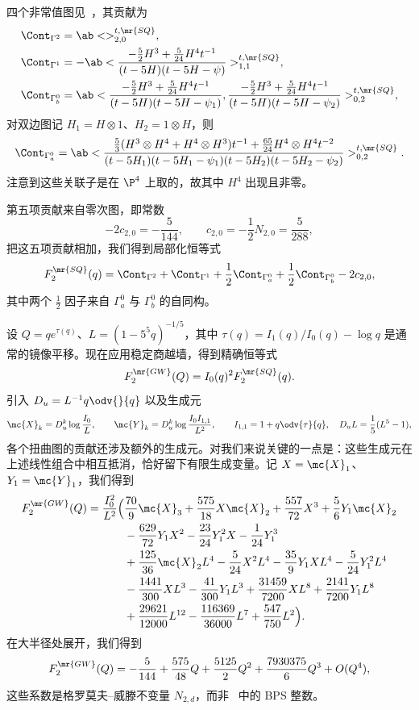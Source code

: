 四个非常值图见~，其贡献为
\begin{align*}
    \Cont_{\Gamma^2} &= \ab<>^{t,\mr{SQ}}_{2,0}, \\
    \Cont_{\Gamma^1} &= -\ab< \frac{-\frac{5}{2}H^3 + \frac{5}{24}H^4t^{-1}}{(t-5H)(t-5H-\psi)}>^{t,\mr{SQ}}_{1,1}, \\
    \Cont_{\Gamma_b^0} &= \ab< \frac{-\frac{5}{2}H^3+\frac{5}{24}H^4t^{-1}}{(t-5H)(t-5H-\psi_1)}, \frac{-\frac{5}{2}H^3+\frac{5}{24}H^4t^{-1}}{(t-5H)(t-5H-\psi_2)}>^{t,\mr{SQ}}_{0,2},
\end{align*}
对双边图记 \(H_1 = H \otimes 1\)、\(H_2 = 1 \otimes H\)，则
\[ \Cont_{\Gamma_a^0} = \ab< \frac{\frac{5}{3}(H^3\otimes H^4 + H^4 \otimes H^3)t^{-1} + \frac{65}{24}H^4 \otimes H^4 t^{-2}}{(t-5H_1)(t-5H_1-\psi_1)(t-5H_2)(t-5H_2-\psi_2)}>^{t,\mr{SQ}}_{0,2}. \]
注意到这些关联子是在 \(\P^4\) 上取的，故其中 \(H^4\) 出现且非零。

第五项贡献来自零次图，即常数
\[ -2c_{2,0} = -\frac{5}{144}, \qquad c_{2,0} = -\frac{1}{2}N_{2,0} = \frac{5}{288}, \]
把这五项贡献相加，我们得到局部化恒等式
\[ F_2^{\mr{SQ}}(q) = \Cont_{\Gamma^2} + \Cont_{\Gamma^1} + \frac{1}{2}\Cont_{\Gamma_a^0} + \frac{1}{2}\Cont_{\Gamma_b^0} - 2c_{2,0}, \]
其中两个 \(\frac{1}{2}\) 因子来自 \(\Gamma_a^0\) 与 \(\Gamma_b^0\) 的自同构。

设 \(Q = qe^{\tau(q)}\)、\(L = (1-5^5q)^{-1/5}\)，其中 \(\tau(q) = I_1(q)/I_0(q) - \log q\) 是通常的镜像平移。现在应用稳定商越墙，得到精确恒等式
\[ F_2^{\mr{GW}}(Q) = I_0(q)^2 F_2^{\mr{SQ}}(q). \]
引入 \(D_u = L^{-1}q\odv{}{q}\) 以及生成元
\[ \mc{X}_k = D_u^k \log \frac{I_0}{L}, \qquad \mc{Y}_k = D_u^k \log \frac{I_0I_{1,1}}{L^2}, \qquad I_{1,1} = 1 + q \odv{\tau}{q}, \quad D_u L = \frac{1}{5}(L^5-1), \]
各个扭曲图的贡献还涉及额外的生成元。对我们来说关键的一点是：这些生成元在上述线性组合中相互抵消，恰好留下有限生成变量。记 \(X = \mc{X}_1\)、\(Y_1 = \mc{Y}_1\)，我们得到
\begin{align*}
    F^{\mr{GW}}_2(Q) = \frac{I_0^2}{L^2}\Big(&\frac{70}{9}\mc{X}_3 + \frac{575}{18}X\mc{X}_2 + \frac{557}{72}X^3 + \frac{5}{6}Y_1\mc{X}_2 \\
    &- \frac{629}{72}Y_1X^2 - \frac{23}{24}Y_1^2 X - \frac{1}{24}Y_1^3 \\
    &+ \frac{125}{36}\mc{X}_2 L^4 - \frac{5}{24}X^2L^4 - \frac{35}{9}Y_1XL^4 - \frac{5}{24}Y_1^2L^4 \\
    &- \frac{1441}{300}XL^3 - \frac{41}{300}Y_1L^3 + \frac{31459}{7200}XL^8 + \frac{2141}{7200}Y_1L^8 \\
    &+ \frac{29621}{12000}L^{12} - \frac{116369}{36000}L^7 + \frac{547}{750}L^2\Big).
\end{align*}
在大半径处展开，我们得到
\[ F_2^{\mr{GW}}(Q) = -\frac{5}{144} + \frac{575}{48}Q + \frac{5125}{2}Q^2 + \frac{7930375}{6}Q^3 + O(Q^4), \]
这些系数是格罗莫夫–威滕不变量 \(N_{2,d}\)，而非~ 中的 BPS 整数。

